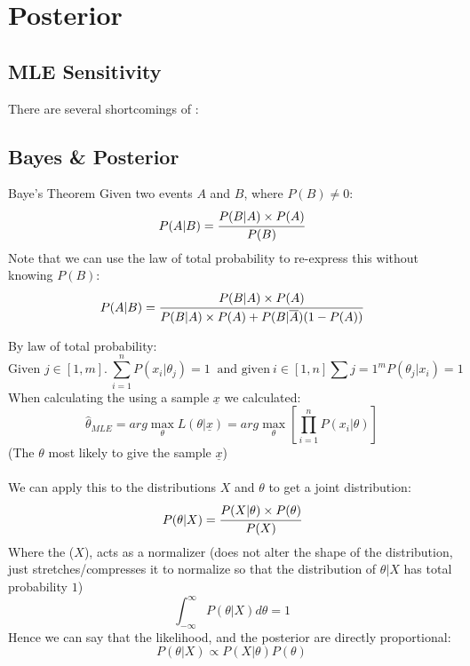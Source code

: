 \chapter{Posterior}

\section{MLE Sensitivity}
There are several shortcomings of :
\begin{itemize}
\end{itemize}

\section{Bayes \& Posterior}
\begin{definitionbox}{Baye's Theorem}
	Given two events $A$ and $B$, where $P(B) \neq 0$:
	\[P(A|B) = \cfrac{P(B|A) \times P(A)}{P(B)}\]
	Note that we can use the law of total probability to re-express this without knowing $P(B)$:
	\[P(A|B) = \cfrac{P(B|A) \times P(A)}{P(B|A) \times P(A) + P(B|\overline{A})(1 - P(A))}\]
\end{definitionbox}
By law of total probability:
\[\text{Given } j \in [1,m]. \ \sum_{i=1}^nP(x_i|\theta_j) = 1 \ \text{ and given} \ i \in [1,n] \sum{j = 1}^mP(\theta_j|x_i) = 1\]
When calculating the  using a sample $\underline{x}$ we calculated:
\[\hat{\theta}_{MLE} = arg \max_{\theta} L(\theta|\underline{x}) = arg \max_{\theta} \left[ \prod_{i=1}^n P(x_i|\theta) \right]\]
(The $\theta$ most likely to give the sample $\underline{x}$)
\\
\\ We can apply this to the distributions $X$ and $\theta$ to get a joint distribution:
\[P(\theta|X) = \cfrac{P(X|\theta)\times P(\theta)}{P(X)}\]
Where the  ($X$), acts as a normalizer (does not alter the shape of the distribution, just stretches/compresses it to normalize so that the distribution of $\theta|X$ has total probability $1$)
\[\int_{-\infty}^{\infty}P(\theta|X)d\theta = 1\]
Hence we can say that the likelihood, and the posterior are directly proportional:
\[P(\theta|X) \varpropto P(X|\theta)P(\theta)\]
